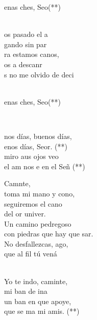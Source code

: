 \documentclass[12pt]{article}
\begin{document}
\begin{multicols*}{2}
\begin{cancion}%
	\begin{chorus}%
	enas ches, Seo(**)\\
	\end{chorus}%
	\jump\\
	os pasado el a \\
	gando sin par\\
	ra estamos canos,\\
	os a descanr\\
	s no me olvido de deci\\\jump\\
	\begin{chorus}%
	enas ches, Seo(**)\\
	\end{chorus}%
	\jump\\
\end{cancion}%

\begin{cancion}%
	nos días, buenos días, \\
	enos días, Seor. (**)\\
	 miro aus ojos veo\\
	 el am nos e en el Señ (**) \\
\end{cancion}%

\begin{cancion}[Caminante][]%
	Camnte,\\
	toma mi mano y cono,\\
	seguiremos el cano\\
	del or univer.\\
Un camino pedregoso\\
	con piedras que hay que sar.\\
	No desfallezcas, ago,\\
	que al fil tú vená\\\jump\\
	\begin{chorus}%
	Yo te indo, caminte,\\
	mi ban de ina\\
	un ban en que apoye, \\
	que se ma mi amis. (**)\\
	\end{chorus}%
	\jump\\
\end{cancion}%


\end{multicols*}
\end{document}
